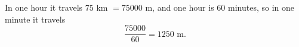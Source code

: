 In one hour it travels $75$ km $=75000$ m, and one hour is $60$ minutes, so in one minute it travels
\[\dfrac{75000}{60}=\boxed{1250\text{ m}}.\]
